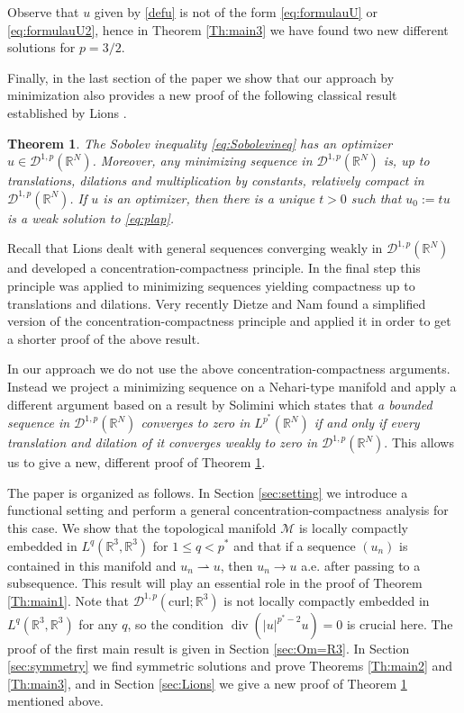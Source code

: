 \documentclass[12pt,leqno,twoside]{amsart}
\newtheorem{Th}{Theorem}[section]
\def\div{\mathop{\mathrm{div}}}
\def\R{\mathbb{R}}
\def\curl{\mathrm{curl}}
\def\rh{\rightharpoonup}
\newcommand{\cD}{{\mathcal D}}
\newcommand{\cM}{{\mathcal M}}
\def\rh{\rightharpoonup}
\numberwithin{equation}{section}
\begin{document}
Observe that $u$ given by  \eqref{defu} is not  of the form \eqref{eq:formulauU} or \eqref{eq:formulauU2}, hence in Theorem \ref{Th:main3} we have found two new different  solutions for $p=3/2$.


 Finally, in the last section of the paper we show that our approach by minimization also provides a new proof of the following classical result established by Lions \cite{Lions}. 

\begin{Th}\label{Th:LionsW}
	The Sobolev inequality \eqref{eq:Sobolevineq} has an optimizer 
	$u \in \cD^{1,p}(\R^N)$. 
	Moreover, any minimizing sequence in $\cD^{1,p}(\R^N)$ is, up to translations, dilations and multiplication by constants, 
	relatively compact in $\cD^{1,p}(\R^N)$. If $u$ is an optimizer, then there is a unique $t>0$ such that $u_0:=tu$ is a weak solution to \eqref{eq:plap}.
\end{Th}

Recall that Lions \cite{Lions} dealt with general sequences converging weakly in $\cD^{1,p}(\R^N)$ and developed a concentration-compactness principle. In the final step this principle was applied to minimizing sequences yielding compactness up to translations and dilations. 
Very recently Dietze and Nam \cite{DNam} found a simplified version of the concentration-compactness principle and applied it in order to get a shorter proof of the above result. 

In our approach we do not use the above concentration-compactness arguments. Instead we project a minimizing sequence on a Nehari-type manifold and apply a different argument based on a result by Solimini \cite{Solimini} which states that {\em a bounded sequence in $\cD^{1,p}(\R^N)$ converges to zero in $L^{p^*}(\R^N)$ if and only if every translation and dilation of it converges weakly to zero in $\cD^{1,p}(\R^N)$}. This allows us to give a new, different proof of Theorem \ref{Th:LionsW}. 


The paper is organized as follows. In Section \ref{sec:setting} we introduce a functional setting and perform a general concentration-compactness analysis for this case. We show that the topological manifold $\cM$
is locally compactly embedded in $L^q(\R^3,\R^3)$ for $1\leq q<p^*$ and that if a sequence $(u_n)$ is contained in this manifold and $u_n\rh u$, then $u_n\to u$ a.e. after passing to a subsequence. This result will play an essential role  in the proof of Theorem \ref{Th:main1}. 
Note that $\cD^{1,p}(\curl;\R^3)$ is not locally compactly embedded in $L^q(\R^3,\R^3)$ for any $q$, so the condition $\div(|u|^{p^*-2}u)=0$ is crucial here.
The proof of the first main result is given in Section \ref{sec:Om=R3}.
In Section \ref{sec:symmetry} we find symmetric solutions and prove Theorems \ref{Th:main2} and \ref{Th:main3}, and in  Section \ref{sec:Lions} we give a new proof of Theorem \ref{Th:LionsW} mentioned above. 
\end{document}
